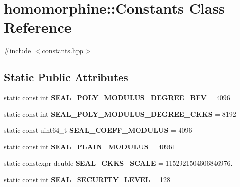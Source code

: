 \hypertarget{classhomomorphine_1_1_constants}{}\section{homomorphine\+:\+:Constants Class Reference}
\label{classhomomorphine_1_1_constants}


{\ttfamily \#include $<$constants.\+hpp$>$}

\subsection*{Static Public Attributes}
\begin{DoxyCompactItemize}
\item 
\mbox{\label{classhomomorphine_1_1_constants_a354ff8671160245be639213c335a47dd}} 
static const int {\bfseries S\+E\+A\+L\+\_\+\+P\+O\+L\+Y\+\_\+\+M\+O\+D\+U\+L\+U\+S\+\_\+\+D\+E\+G\+R\+E\+E\+\_\+\+B\+FV} = 4096
\item 
\mbox{\label{classhomomorphine_1_1_constants_acc9b94c27229e11b88f013eb4c09f526}} 
static const int {\bfseries S\+E\+A\+L\+\_\+\+P\+O\+L\+Y\+\_\+\+M\+O\+D\+U\+L\+U\+S\+\_\+\+D\+E\+G\+R\+E\+E\+\_\+\+C\+K\+KS} = 8192
\item 
\mbox{\label{classhomomorphine_1_1_constants_ad87143078aecc13a757523a87ca5f6c1}} 
static const uint64\+\_\+t {\bfseries S\+E\+A\+L\+\_\+\+C\+O\+E\+F\+F\+\_\+\+M\+O\+D\+U\+L\+US} = 4096
\item 
\mbox{\label{classhomomorphine_1_1_constants_a4fea8db185713db5b7c0a9b455adb06e}} 
static const int {\bfseries S\+E\+A\+L\+\_\+\+P\+L\+A\+I\+N\+\_\+\+M\+O\+D\+U\+L\+US} = 40961
\item 
\mbox{\label{classhomomorphine_1_1_constants_ab10b8c769059fcf9f04f16963c384677}} 
static constexpr double {\bfseries S\+E\+A\+L\+\_\+\+C\+K\+K\+S\+\_\+\+S\+C\+A\+LE} = 1152921504606846976.
\item 
\mbox{\label{classhomomorphine_1_1_constants_a3eb0cdf60add8c31fdb68c1df36fd27c}} 
static const int {\bfseries S\+E\+A\+L\+\_\+\+S\+E\+C\+U\+R\+I\+T\+Y\+\_\+\+L\+E\+V\+EL} = 128

\end{DoxyCompactItemize}
